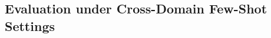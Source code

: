 \documentclass[lettersize,journal]{IEEEtran}
\begin{document}



\subsection{Evaluation under Cross-Domain Few-Shot Settings}
\end{document}
